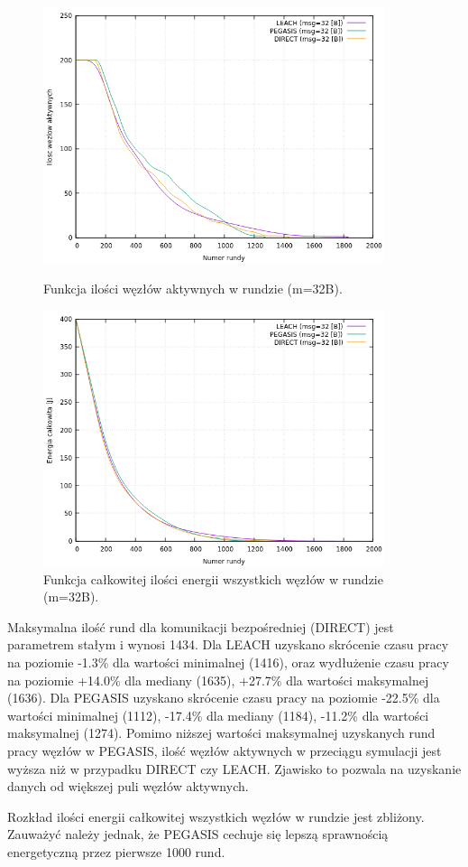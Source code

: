 \documentclass[a4paper,12pt,twoside,openany]{report}
\begin{document}
\begin{figure}[H]
 \centering
 \includegraphics[width=10cm]{images/gnuplot/test_1/nodes_in_round_m32.png}
 \caption{Funkcja ilości węzłów aktywnych w rundzie (m=32B).}
 \includegraphics[width=10cm]{images/gnuplot/test_1/energy_in_round_m32.png}
 \caption{Funkcja całkowitej ilości energii wszystkich węzłów w rundzie (m=32B).}
\end{figure}

\par
Maksymalna ilość rund dla komunikacji bezpośredniej (DIRECT) jest parametrem stałym i wynosi 1434.
Dla LEACH uzyskano skrócenie czasu pracy na poziomie -1.3\% dla wartości minimalnej (1416), oraz wydłużenie czasu pracy na poziomie +14.0\% dla mediany (1635), +27.7\% dla wartości maksymalnej (1636).
Dla PEGASIS uzyskano skrócenie czasu pracy na poziomie -22.5\% dla wartości minimalnej (1112), -17.4\% dla mediany (1184), -11.2\% dla wartości maksymalnej (1274).
Pomimo niższej wartości maksymalnej uzyskanych rund pracy węzłów w PEGASIS, ilość węzłów aktywnych w przeciągu symulacji jest wyższa niż w przypadku DIRECT czy LEACH.
Zjawisko to pozwala na uzyskanie danych od większej puli węzłów aktywnych.
\par 
Rozkład ilości energii całkowitej wszystkich węzłów w rundzie jest zbliżony.
Zauważyć należy jednak, że PEGASIS cechuje się lepszą sprawnością energetyczną przez pierwsze 1000 rund.
\end{document}
